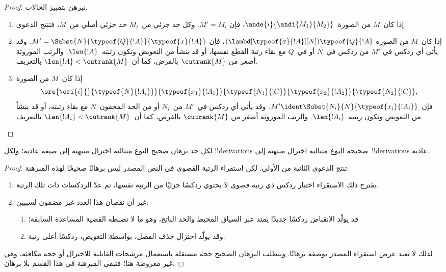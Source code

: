 \documentclass[../../../include/open-logic-section]{subfiles}
\begin{document}
\begin{proof}
  نبرهن بتمييز الحالات.
  \begin{enumerate}
  \item إذا كان~$M$ من الصورة~$\ande{i}{\andi{M_1}{M_2}}$، فإن
    $M'=M_i$. وكل حد جزئي من~$M_i$ حد جزئي أصلي من~$M$، فتنتج الدعوى.
  \item إذا كان~$M$ من الصورة
    $(\lambd[\typeof{x}{!A}][N])\typeof{Q}{!A}$، فإن
    $M'=\Subst{N}{\typeof{Q}{!A}}{\typeof{x}{!A}}$. وقد يأتي أي ردكس في
    $M'$ من ردكس في~$N$ أو في~$Q$ مع بقاء رتبة القطع نفسها، أو قد ينشأ من
    التعويض وتكون رتبته~$\len{!A}$. والرتب الموروثة أصغر من
    $\cutrank{M}$ بالفرض، كما أن~$\len{!A}<\cutrank{M}$ بالتعريف.
  \item إذا كان~$M$ من الصورة
    \[
    \ore{\ori{i}{}{\typeof{N}{!A_i}}}
        {\typeof{x_1}{!A_1}}{\typeof{N_1}{!C}}
        {\typeof{x_2}{!A_2}}{\typeof{N_2}{!C}},
    \]
    فإن~$M'\ident\Subst{N_i}{N}{\typeof{x_i}{!A_i}}$. وقد يأتي أي ردكس
    في~$M'$ من~$N_i$ أو من الحد المحقون~$N$ مع بقاء رتبته، أو قد ينشأ من
    التعويض وتكون رتبته~$\len{!A_i}$. والرتب الموروثة أصغر من
    $\cutrank{M}$ بالفرض، كما أن~$\len{!A_i}<\cutrank{M}$ بالتعريف.
  \end{enumerate}
\end{proof}

\begin{thm}
  لكل حد برهان صحيح النوع متتالية اختزال منتهية إلى صيغة عادية؛ ولكل
  !!{derivation}s صحيحة النوع متتالية اختزال منتهية إلى~!!{derivation}s
  عادية.
\end{thm}

\begin{proof}
  تنتج الدعوى الثانية من الأولى. لكن استقراء الرتبة القصوى في النص المصدر
  ليس برهانًا صحيحًا لهذه المبرهنة:
  \begin{enumerate}
  \item يقترح ذلك الاستقراء اختيار ردكس ذي رتبة قصوى لا يحتوي ردكسًا جزئيًا
    من الرتبة نفسها، ثم عدّ الردكسات ذات تلك الرتبة.
  \item غير أن نقصان هذا العدد غير مضمون لسببين:
    \begin{enumerate}
    \item قد يولّد الانقباض ردكسًا جديدًا يمتد عبر السياق المحيط والحد
      الناتج، وهو ما لا تضبطه القضية المساعدة السابقة؛
    \item وقد يولّد اختزال حذف الفصل، بواسطة التعويض، ردكسًا أعلى رتبة.
    \end{enumerate}
  \end{enumerate}
  لذلك لا نعيد عرض استقراء المصدر بوصفه برهانًا. ويتطلب البرهان الصحيح حجة
  مستقلة باستعمال مرشحات القابلية للاختزال أو حجة مكافئة، وهي غير معروضة
  هنا؛ فتبقى المبرهنة في هذا القسم بلا برهان.
\end{proof}
\end{document}
